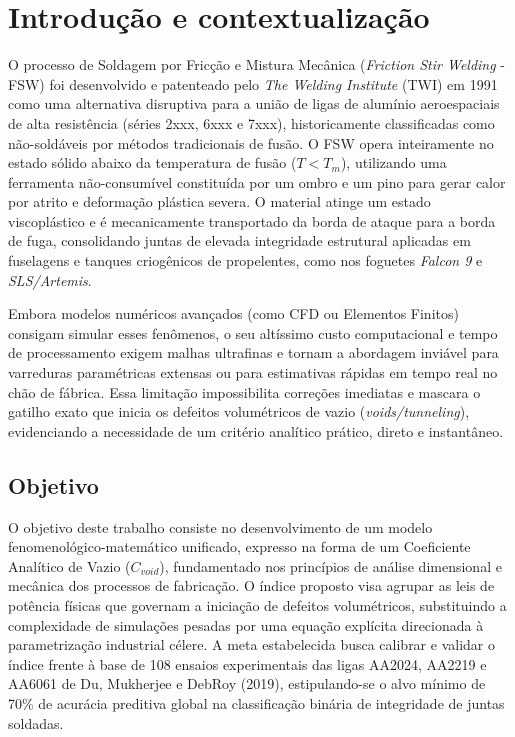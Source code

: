 \documentclass[12pt,openany]{report}
\begin{document}
\begin{singlespace}
\makeatletter
{} 
\makeatother
\end{singlespace}

\newpage
{}
\setcounter{page}{4} 

\chapter{Introdução e contextualização}

O processo de Soldagem por Fricção e Mistura Mecânica (\textit{Friction Stir Welding} - FSW) foi desenvolvido e patenteado pelo \textit{The Welding Institute} (TWI) em 1991 como uma alternativa disruptiva para a união de ligas de alumínio aeroespaciais de alta resistência (séries 2xxx, 6xxx e 7xxx), historicamente classificadas como não-soldáveis por métodos tradicionais de fusão. O FSW opera inteiramente no estado sólido abaixo da temperatura de fusão ($T < T_m$), utilizando uma ferramenta não-consumível constituída por um ombro e um pino para gerar calor por atrito e deformação plástica severa. O material atinge um estado viscoplástico e é mecanicamente transportado da borda de ataque para a borda de fuga, consolidando juntas de elevada integridade estrutural aplicadas em fuselagens e tanques criogênicos de propelentes, como nos foguetes \textit{Falcon 9} e \textit{SLS/Artemis}.

Embora modelos numéricos avançados (como CFD ou Elementos Finitos) consigam simular esses fenômenos, o seu altíssimo custo computacional e tempo de processamento exigem malhas ultrafinas e tornam a abordagem inviável para varreduras paramétricas extensas ou para estimativas rápidas em tempo real no chão de fábrica. Essa limitação impossibilita correções imediatas e mascara o gatilho exato que inicia os defeitos volumétricos de vazio (\textit{voids/tunneling}), evidenciando a necessidade de um critério analítico prático, direto e instantâneo.

\section{Objetivo}

O objetivo deste trabalho consiste no desenvolvimento de um modelo fenomenológico-matemático unificado, expresso na forma de um Coeficiente Analítico de Vazio ($C_{void}$), fundamentado nos princípios de análise dimensional e mecânica dos processos de fabricação. O índice proposto visa agrupar as leis de potência físicas que governam a iniciação de defeitos volumétricos, substituindo a complexidade de simulações pesadas por uma equação explícita direcionada à parametrização industrial célere. A meta estabelecida busca calibrar e validar o índice frente à base de 108 ensaios experimentais das ligas AA2024, AA2219 e AA6061 de Du, Mukherjee e DebRoy (2019), estipulando-se o alvo mínimo de 70\% de acurácia preditiva global na classificação binária de integridade de juntas soldadas.
\end{document}

